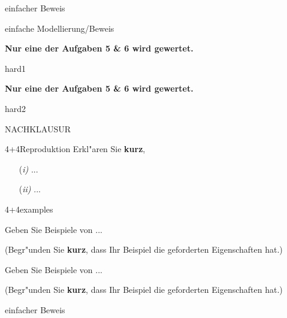 \documentclass[a4paper]{article}
\begin{document}
\pagebreak
\begin{klaufg}{8}{einfacher Beweis}

\end{klaufg}

\pagebreak
\begin{klaufg}{8}{einfache Modellierung/Beweis}

  
\end{klaufg}
 
\pagebreak
{\bfseries Nur eine der Aufgaben 5 \& 6 wird gewertet.}
\bigskip
\bigskip

\begin{klaufg}{8}{hard1}

\end{klaufg}

\pagebreak
{\bfseries Nur eine der Aufgaben 5 \& 6 wird gewertet.}
\bigskip
\bigskip

\begin{klaufg}{8}{hard2}

\end{klaufg}

\pagebreak
NACHKLAUSUR

\begin{klaufg}{4+4}{Reproduktion}
  Erkl"aren Sie {\bfseries\sffamily kurz},

\begin{enumerate} %
\item[(\it i)] ...
   \vfill
\item[(\it ii)] ...
 \vfill
\end{enumerate}

\end{klaufg}

\pagebreak
\begin{klaufg}{4+4}{examples}


  Geben Sie Beispiele von ...

  (Begr"unden Sie {\bfseries\sffamily kurz}, dass Ihr Beispiel die
  geforderten Eigenschaften hat.)
  \pagebreak
  
    Geben Sie Beispiele von ...
  
  (Begr"unden Sie {\bfseries\sffamily kurz}, dass Ihr Beispiel die
  geforderten Eigenschaften hat.)

\end{klaufg}

\pagebreak
\begin{klaufg}{8}{einfacher Beweis}

\end{klaufg}
\end{document}
